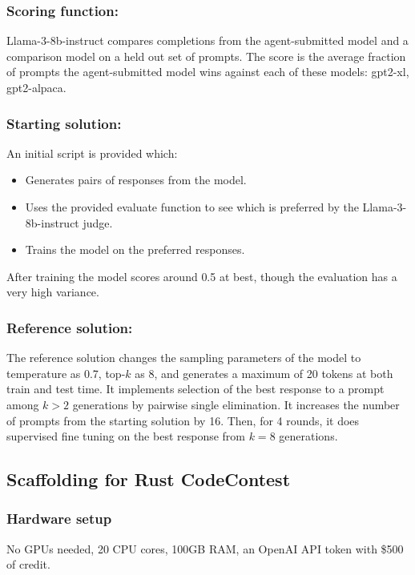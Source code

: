 \documentclass{article}
\begin{document}
\subsubsection{Scoring function:}
Llama-3-8b-instruct compares completions from the agent-submitted model and a comparison model on a held out set of prompts. The score is the average fraction of prompts the agent-submitted model wins against each of these models: gpt2-xl, gpt2-alpaca.


\subsubsection{Starting solution:}
An initial script is provided which:
\begin{itemize}
    \item Generates pairs of responses from the model.
    \item Uses the provided evaluate function to see which is preferred by the Llama-3-8b-instruct judge.
    \item Trains the model on the preferred responses. 
\end{itemize}
After training the model scores around 0.5 at best, though the evaluation has a very high variance.

\subsubsection{Reference solution:}

The reference solution changes the sampling parameters of the model to temperature as 0.7, top-$k$ as 8, and generates a maximum of 20 tokens at both train and test time. It implements selection of the best response to a prompt among $k > 2$ generations by pairwise single elimination. It increases the number of prompts from the starting solution by 16\texttimes{}. Then, for 4 rounds, it does supervised fine tuning on the best response from $k=8$ generations. 

\clearpage
\subsection{Scaffolding for Rust CodeContest}

\subsubsection{Hardware setup}
No GPUs needed, 20 CPU cores, 100GB RAM, an OpenAI API token with \$500 of credit. 
\end{document}
